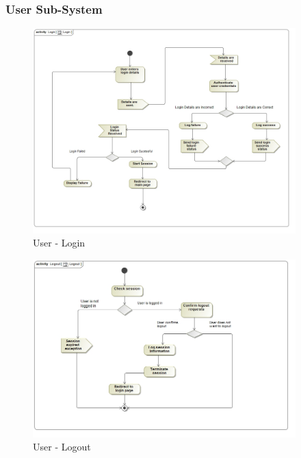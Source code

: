 \documentclass{article}
\begin{document}
		\subsubsection{User Sub-System}
			\begin{figure}[H]
				\includegraphics[width=4in, center]{../Diagrams/Process Specifications/User subsystem/Login.jpg}
				\caption{User - Login}
			\end{figure}
			\begin{figure}[H]
				\includegraphics[width=4in, center]{../Diagrams/Process Specifications/User subsystem/Logout.jpg}
				\caption{User - Logout}
			\end{figure}
\end{document}
